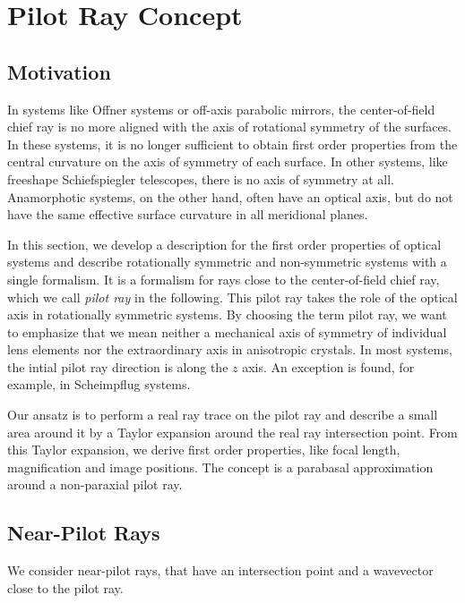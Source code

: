 \documentclass[12pt,a4paper,twoside,openright,BCOR10mm,headsepline,titlepage,abstracton,chapterprefix,final]{scrreprt}
\begin{document}
\section{Pilot Ray Concept}

\subsection{Motivation}

In systems like Offner systems or off-axis parabolic mirrors, the center-of-field chief ray is no more aligned with the axis of rotational symmetry of the surfaces.
In these systems, it is no longer sufficient to obtain first order properties from the central curvature on the axis of symmetry of each surface.
In other systems, like freeshape Schiefspiegler telescopes, there is no axis of symmetry at all. 
Anamorphotic systems, on the other hand, often have an optical axis, but do not have the same effective surface curvature in all meridional planes.

In this section, we develop a description for the first order properties of optical systems 
and describe rotationally symmetric and non-symmetric systems with a single formalism.
It is a formalism for rays close to the center-of-field chief ray, which we call \emph{pilot ray} in the following.
This pilot ray takes the role of the optical axis in rotationally symmetric systems. 
By choosing the term pilot ray, we want to emphasize that we mean neither a mechanical axis of symmetry of individual lens elements nor the extraordinary axis in anisotropic crystals.
In most systems, the intial pilot ray direction is along the $z$ axis. 
An exception is found, for example, in Scheimpflug systems.

Our ansatz is to perform a real ray trace on the pilot ray and describe a small area around it by a Taylor expansion around the real ray intersection point.
From this Taylor expansion, we derive first order properties, like focal length, magnification and image positions.
The concept is a parabasal approximation around a non-paraxial pilot ray.



\subsection{Near-Pilot Rays}

We consider near-pilot rays, that have an intersection point and a wavevector close to the pilot ray.
\end{document}
